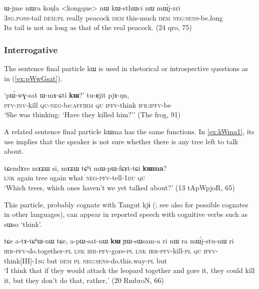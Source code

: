 \documentclass[oldfontcommands,oneside,a4paper,11pt]{article}
\newcommand{\ipa}[1]{{\phon #1}} %
\begin{document}
  \begin{exe}
\ex \label{ex:kWsthWci}
\gll 
 \ipa{ɯ-jme}  	\ipa{nɯra}  	\ipa{koŋla}  	<kongque> 	\ipa{nɯ}  	\ipa{kɯ-sthɯci}  	\ipa{nɯ}  	\ipa{mɯ́j-zri}  \\
\textsc{ 3sg.poss}-tail \textsc{dem:pl} really peacock \textsc{dem} this-much \textsc{dem} \textsc{neg:sens}-be.long \\
\glt Its tail is not as long as that of the real peacock. (24 qro, 75)
  \end{exe}
 
\subsubsection{Interrogative}
The sentence final particle \ipa{kɯ} is used in rhetorical or  introspective questions as in  (\ref{ex:pWwGsat}).  
 
  \begin{exe} 
 \ex \label{ex:pWwGsat}
\gll 
`\ipa{pɯ́-wɣ-sat} 	\ipa{ɯ-mɤ-ɕti} 	\ipa{\textbf{kɯ}?}' 	\ipa{tu-ʁjit} 	\ipa{pjɤ-ŋu,} \\
\textsc{pfv-inv}-kill \textsc{qu-neg}-be:\textsc{affirm} \textsc{qu} \textsc{ipfv}-think \textsc{ifr:ipfv}-be \\
\glt `She was thinking: `Have they killed him?'' (The frog, 91)
 \end{exe}  
 
 A related sentence final particle \ipa{kɯma} has the same functions. In  \ref{ex:kWma1}, its use implies that   the speaker is not sure whether there is any tree left to talk about.
 
   \begin{exe} 
 \ex \label{ex:kWma1}
\gll 
 \ipa{tɕendɤre} 	\ipa{mɤʑɯ} 	\ipa{si,} 	\ipa{mɤʑɯ} 	\ipa{tɕʰi} 	\ipa{mɯ-pɯ-fɕɤt-tɕi} 	\ipa{\textbf{kɯma}?} \\
\textsc{lnk} again tree again what \textsc{neg-pfv}-tell-\textsc{1du} \textsc{qu} \\
\glt `Which trees, which ones haven't we yet talked about?'  (13 tApWpjoR, 65)
  \end{exe} 

This particle, probably cognate with Tangut \ipa{kjɨ} (\citealt{jacques11tangut.verb}; see also \citealt{sunhk95yiwen} for possible cognates in other languages), can appear in reported speech with cognitive verbs such as \ipa{sɯso} `think'.

    \begin{exe} 
 \ex \label{ex:kW.YWsWsama}
\gll \ipa{a-kɤ-nɯtsʰɤβ-nɯ} 	\ipa{tɕe} 	\ipa{a-tɤ-tɕʰɯ-nɯ} 	\ipa{tɕe,} 	\ipa{a-pɯ-sat-nɯ} 	\ipa{\textbf{kɯ}} 	\ipa{ɲɯ-sɯsam-a} 	\ipa{ri}  \ipa{nɯ} \ipa{ra} 	\ipa{mɯ́j-stu-nɯ} 	\ipa{ri} \\
\textsc{irr-pfv}-do.together-\textsc{pl} \textsc{lnk} \textsc{irr-pfv}-gore-\textsc{pl} \textsc{lnk } \textsc{irr-pfv}-kill-\textsc{pl} \textsc{qu} \textsc{ipfv}-think[III]-\textsc{1sg} but \textsc{dem} \textsc{pl} \textsc{neg:sens}-do.this.way-\textsc{pl}  but \\
\glt `I think that if they would attack the leopard together and gore it, they could kill it, but they don't do that, rather,' (20 RmbroN, 66)
 \end{exe} 
 
\end{document}
